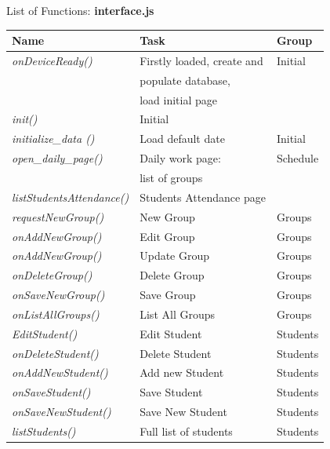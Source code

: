 \begin{bclogo}[couleur=orange!30,logo=\bcbook, arrondi=0.1,ombre=true ] 
{List of Functions: {\bf interface.js}}	
\begin{tabular}{lll}
Name                    & Task            & Group \\
\hline
\emph{ onDeviceReady()  }&  Firstly loaded, create and    &  Initial\\
&populate database,              &                          \\
&load initial page               &                          \\
\emph{ init()  } &Initial                         &   \\
\emph{ initialize\_data ()      } &Load default date               &    Initial \\
\emph{ open\_daily\_page()     } &Daily work page:                &   Schedule \\
& list of groups                  &                           \\
\emph{ listStudentsAttendance() }&Students Attendance page        &   \\
\emph{ requestNewGroup()     }   & New Group                       &  Groups \\
\emph{ onAddNewGroup()       }   &Edit Group                      &   Groups \\
\emph{ onAddNewGroup()       }   &Update Group                    &  Groups \\
\emph{ onDeleteGroup()       }   &Delete Group                    &   Groups \\    
\emph{ onSaveNewGroup()      }   &Save Group                      &   Groups \\
\emph{ onListAllGroups()     }   &List All Groups                 &  Groups \\
\emph{ EditStudent()         }   &Edit Student                    &   Students \\
\emph{ onDeleteStudent()     }   & Delete Student                  &  Students \\   
\emph{ onAddNewStudent()     }   &Add new Student                 &   Students \\    
\emph{ onSaveStudent()       }   &Save Student                    &  Students \\
\emph{ onSaveNewStudent()    }   & Save New Student                &   Students \\
\emph{ listStudents()        }   & Full list of students           &  Students \\

\end{tabular}
\end{bclogo}
